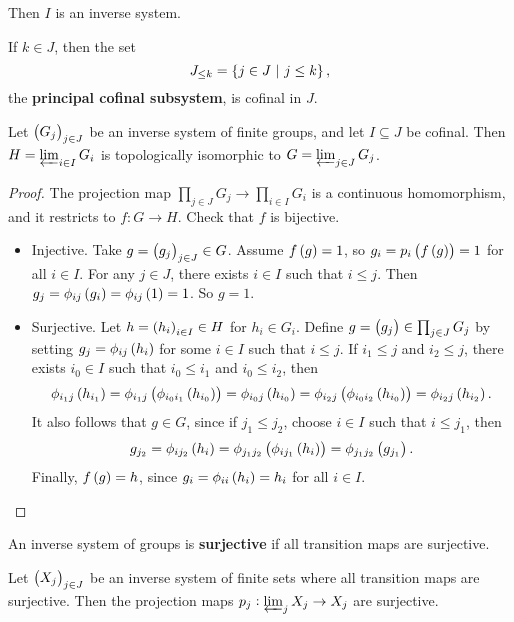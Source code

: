 Then $ I $ is an inverse system.

\begin{example}
If $ k \in J $, then the set
$$ J_{\le k} = \cbr{j \in J \st j \le k}, $$
the \textbf{principal cofinal subsystem}, is cofinal in $ J $.
\end{example}

\begin{proposition}
Let $ \br{G_j}_{j \in J} $ be an inverse system of finite groups, and let $ I \subseteq J $ be cofinal. Then $ H = \varprojlim_{i \in I} G_i $ is topologically isomorphic to $ G = \varprojlim_{j \in J} G_j $.
\end{proposition}

\begin{proof}
The projection map $ \prod_{j \in J} G_j \to \prod_{i \in I} G_i $ is a continuous homomorphism, and it restricts to $ f : G \to H $. Check that $ f $ is bijective.
\begin{itemize}
\item Injective. Take $ g = \br{g_j}_{j \in J} \in G $. Assume $ f\br{g} = 1 $, so $ g_i = p_i\br{f\br{g}} = 1 $ for all $ i \in I $. For any $ j \in J $, there exists $ i \in I $ such that $ i \le j $. Then $ g_j = \phi_{ij}\br{g_i} = \phi_{ij}\br{1} = 1 $. So $ g = 1 $.
\item Surjective. Let $ h = \br{h_i}_{i \in I} \in H $ for $ h_i \in G_i $. Define $ g = \br{g_j} \in \prod_{j \in J} G_j $ by setting $ g_j = \phi_{ij}\br{h_i} $ for some $ i \in I $ such that $ i \le j $. If $ i_1 \le j $ and $ i_2 \le j $, there exists $ i_0 \in I $ such that $ i_0 \le i_1 $ and $ i_0 \le i_2 $, then
$$ \phi_{i_1j}\br{h_{i_1}} = \phi_{i_1j}\br{\phi_{i_0i_1}\br{h_{i_0}}} = \phi_{i_0j}\br{h_{i_0}} = \phi_{i_2j}\br{\phi_{i_0i_2}\br{h_{i_0}}} = \phi_{i_2j}\br{h_{i_2}}. $$
It also follows that $ g \in G $, since if $ j_1 \le j_2 $, choose $ i \in I $ such that $ i \le j_1 $, then
$$ g_{j_2} = \phi_{ij_2}\br{h_i} = \phi_{j_1j_2}\br{\phi_{ij_1}\br{h_i}} = \phi_{j_1j_2}\br{g_{j_1}}. $$
Finally, $ f\br{g} = h $, since $ g_i = \phi_{ii}\br{h_i} = h_i $ for all $ i \in I $.
\end{itemize}
\end{proof}

\begin{definition}
An inverse system of groups is \textbf{surjective} if all transition maps are surjective.
\end{definition}

\begin{proposition}
Let $ \br{X_j}_{j \in J} $ be an inverse system of finite sets where all transition maps are surjective. Then the projection maps $ p_j : \varprojlim_j X_j \to X_j $ are surjective.
\end{proposition}

